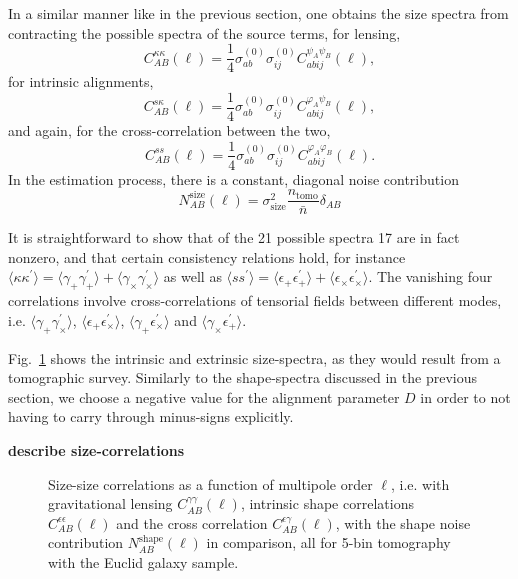 \documentclass[a4paper,fleqn,usenatbib]{mnras}
\def\spirou#1{{\bf #1}}
\newcommand{\bra}{\langle}
\newcommand{\ket}{\rangle}
\begin{document}
In a similar manner like in the previous section, one obtains the size spectra from contracting the possible spectra of the source terms, for lensing,
\begin{equation}
C^{\kappa\kappa}_{AB}(\ell) = \frac{1}{4}\sigma^{(0)}_{ab}\sigma^{(0)}_{ij}C^{\psi_A\psi_B}_{abij}(\ell),
\end{equation}
for intrinsic alignments,
\begin{equation}
C^{s\kappa}_{AB}(\ell) = \frac{1}{4}\sigma^{(0)}_{ab}\sigma^{(0)}_{ij}C^{\varphi_A\psi_B}_{abij}(\ell),
\end{equation}
and again, for the cross-correlation between the two,
\begin{equation}
C^{ss}_{AB}(\ell) = \frac{1}{4}\sigma^{(0)}_{ab}\sigma^{(0)}_{ij}C^{\varphi_A\varphi_B}_{abij}(\ell).
\end{equation}
In the estimation process, there is a constant, diagonal noise contribution
\begin{equation}
N_{AB}^\mathrm{size}(\ell) = \sigma^2_\mathrm{size} \frac{n_\mathrm{tomo}}{\bar{n}}\delta_{AB}
\end{equation}

It is straightforward to show that of the 21 possible spectra 17 are in fact nonzero, and that certain consistency relations hold, for instance $\bra\kappa\kappa^\prime\ket = \bra\gamma_+\gamma_+^\prime\ket + \bra\gamma_\times\gamma_\times^\prime\ket$ as well as $\bra ss^\prime\ket = \bra\epsilon_+\epsilon_+^\prime\ket + \bra\epsilon_\times\epsilon_\times^\prime\ket$. The vanishing four correlations involve cross-correlations of tensorial fields between different modes, i.e. $\bra\gamma_+\gamma_\times^\prime\ket$, $\bra\epsilon_+\epsilon_\times^\prime\ket$, $\bra\gamma_+\epsilon_\times^\prime\ket$ and $\bra\gamma_\times\epsilon_+^\prime\ket$.

Fig.~\ref{fig:sizesize} shows the intrinsic and extrinsic size-spectra, as they would result from a tomographic survey. Similarly to the shape-spectra discussed in the previous section, we choose a negative value for the alignment parameter $D$ in order to not having to carry through minus-signs explicitly.

\spirou{describe size-correlations}


\begin{figure}
\centering
\caption{Size-size correlations as a function of multipole order $\ell$, i.e. with gravitational lensing $C_{AB}^{\gamma\gamma}(\ell)$, intrinsic shape correlations $C_{AB}^{\epsilon\epsilon}(\ell)$ and the cross correlation $C_{AB}^{\epsilon\gamma}(\ell)$, with the shape noise contribution $N_{AB}^\mathrm{shape}(\ell)$ in comparison, all for 5-bin tomography with the Euclid galaxy sample.}
\label{fig:sizesize}
\end{figure}
\end{document}
